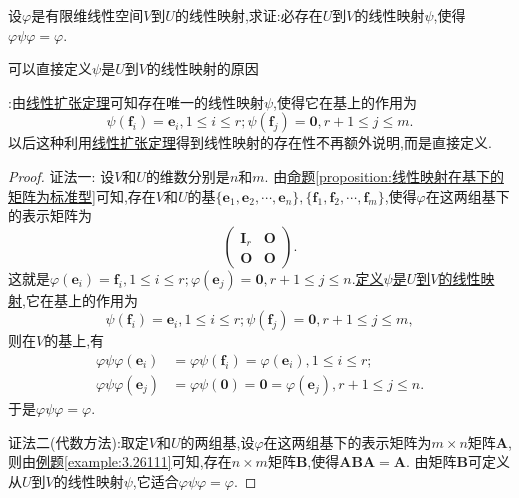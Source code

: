 \documentclass[../../main.tex]{subfiles}%
\begin{document}
\begin{example}
设\(\varphi\)是有限维线性空间\(V\)到\(U\)的线性映射,求证:必存在\(U\)到\(V\)的线性映射\(\psi\),使得\(\varphi\psi\varphi=\varphi\).
\end{example}
\begin{note}
\hypertarget{可以定义线性映射的原因}{可以直接定义\(\psi\)是\(U\)到\(V\)的线性映射的原因}:由\hyperref[theorem:线性扩张定理]{线性扩张定理}可知存在唯一的线性映射\(\psi\),使得它在基上的作用为
\[
\psi(\boldsymbol{f}_i)=\boldsymbol{e}_i,1\leqslant  i\leqslant  r;\psi(\boldsymbol{f}_j)=\boldsymbol{0},r + 1\leqslant  j\leqslant  m.
\]
以后这种利用\hyperref[theorem:线性扩张定理]{线性扩张定理}得到线性映射的存在性不再额外说明,而是直接定义.
\end{note}
\begin{proof}

{\color{blue}证法一:}
设\(V\)和\(U\)的维数分别是\(n\)和\(m\). 由\hyperref[proposition:线性映射在基下的矩阵为标准型]{命题\ref{proposition:线性映射在基下的矩阵为标准型}}可知,存在\(V\)和\(U\)的基\(\{\boldsymbol{e}_1,\boldsymbol{e}_2,\cdots,\boldsymbol{e}_n\},\{\boldsymbol{f}_1,\boldsymbol{f}_2,\cdots,\boldsymbol{f}_m\}\),使得\(\varphi\)在这两组基下的表示矩阵为
\[
\begin{pmatrix}
\boldsymbol{I}_r&\boldsymbol{O}\\
\boldsymbol{O}&\boldsymbol{O}
\end{pmatrix}.
\]
这就是\(\varphi(\boldsymbol{e}_i)=\boldsymbol{f}_i,1\leqslant  i\leqslant  r;\varphi(\boldsymbol{e}_j)=\boldsymbol{0},r + 1\leqslant  j\leqslant  n\).\hyperlink{可以定义线性映射的原因}{定义\(\psi\)是\(U\)到\(V\)的线性映射},它在基上的作用为
\[
\psi(\boldsymbol{f}_i)=\boldsymbol{e}_i,1\leqslant  i\leqslant  r;\psi(\boldsymbol{f}_j)=\boldsymbol{0},r + 1\leqslant  j\leqslant  m,
\]
则在\(V\)的基上,有
\begin{align*}
\varphi\psi\varphi(\boldsymbol{e}_i)&=\varphi\psi(\boldsymbol{f}_i)=\varphi(\boldsymbol{e}_i),1\leqslant  i\leqslant  r;\\
\varphi\psi\varphi(\boldsymbol{e}_j)&=\varphi\psi(\boldsymbol{0})=\boldsymbol{0}=\varphi(\boldsymbol{e}_j),r + 1\leqslant  j\leqslant  n.
\end{align*}
于是\(\varphi\psi\varphi=\varphi\).

{\color{blue}证法二(代数方法):}取定\(V\)和\(U\)的两组基,设\(\varphi\)在这两组基下的表示矩阵为\(m\times n\)矩阵\(\boldsymbol{A}\),则由\hyperref[example:3.26111]{例题\ref{example:3.26111}}可知,存在\(n\times m\)矩阵\(\boldsymbol{B}\),使得\(\boldsymbol{A}\boldsymbol{B}\boldsymbol{A}=\boldsymbol{A}\). 由矩阵\(\boldsymbol{B}\)可定义从\(U\)到\(V\)的线性映射\(\psi\),它适合\(\varphi\psi\varphi=\varphi\).

\end{proof}
\end{document}
